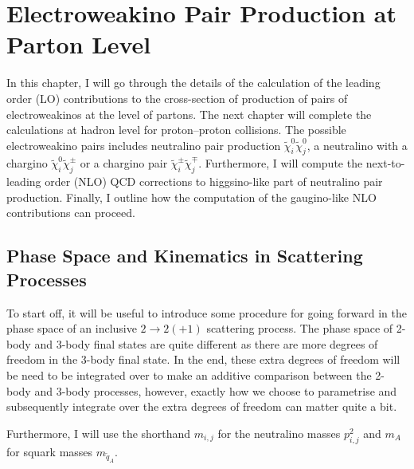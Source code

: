 \documentclass[../main.tex]{subfiles}
\begin{document}
\chapter{Electroweakino Pair Production at Parton Level}
\label{chap:part:parton_calculation}
In this chapter, I will go through the details of the calculation of the leading order (LO) contributions to the cross-section of production of pairs of electroweakinos at the level of partons.
The next chapter will complete the calculations at hadron level for proton--proton collisions.
The possible electroweakino pairs includes neutralino pair production \(\tilde\chi^0_i \tilde\chi^0_j\), a neutralino with a chargino \(\tilde\chi^0_i \tilde\chi^\pm_j\) or a chargino pair \(\tilde\chi^\pm_i \tilde\chi^\mp_j\).
Furthermore, I will compute the next-to-leading order (NLO) QCD corrections to higgsino-like part of neutralino pair production.
Finally, I outline how the computation of the gaugino-like NLO contributions can proceed.


\section{Phase Space and Kinematics in Scattering Processes}
To start off, it will be useful to introduce some procedure for going forward
in the phase space of an inclusive \(2\to 2(+1)\) scattering process.
The phase space of 2-body and 3-body final states are quite different as there are
more degrees of freedom in the 3-body final state.
In the end, these extra degrees of freedom will be need to be integrated over to make an additive
comparison between the 2-body and 3-body processes, however, exactly how we
choose to parametrise and subsequently integrate over the extra degrees of
freedom can matter quite a bit.
\medskip

Furthermore, I will use the shorthand \(m_{i,j}\) for the neutralino masses \(p_{i,j}^2\) and \(m_A\) for squark masses \(m_{\tilde{q}_A}\).
\end{document}
